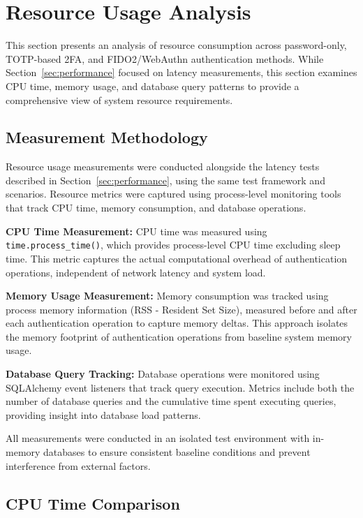 \section{Resource Usage Analysis}\label{sec:resource-usage}

This section presents an analysis of resource consumption across password-only, TOTP-based 2FA, and FIDO2/WebAuthn authentication methods. While Section~\ref{sec:performance} focused on latency measurements, this section examines CPU time, memory usage, and database query patterns to provide a comprehensive view of system resource requirements.

\subsection{Measurement Methodology}

Resource usage measurements were conducted alongside the latency tests described in Section~\ref{sec:performance}, using the same test framework and scenarios. Resource metrics were captured using process-level monitoring tools that track CPU time, memory consumption, and database operations.

\textbf{CPU Time Measurement:} CPU time was measured using \texttt{time.process\_time()}, which provides process-level CPU time excluding sleep time. This metric captures the actual computational overhead of authentication operations, independent of network latency and system load.

\textbf{Memory Usage Measurement:} Memory consumption was tracked using process memory information (RSS - Resident Set Size), measured before and after each authentication operation to capture memory deltas. This approach isolates the memory footprint of authentication operations from baseline system memory usage.

\textbf{Database Query Tracking:} Database operations were monitored using SQLAlchemy event listeners that track query execution. Metrics include both the number of database queries and the cumulative time spent executing queries, providing insight into database load patterns.

All measurements were conducted in an isolated test environment with in-memory databases to ensure consistent baseline conditions and prevent interference from external factors.

\subsection{CPU Time Comparison}


